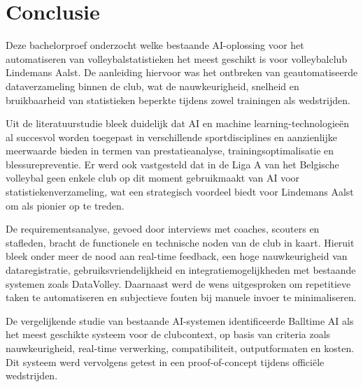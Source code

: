 
\chapter{Conclusie}%
\label{ch:conclusie}


Deze bachelorproef onderzocht welke bestaande AI-oplossing voor het automatiseren van volleybalstatistieken het meest geschikt is voor volleybalclub Lindemans Aalst. De aanleiding hiervoor was het ontbreken van geautomatiseerde dataverzameling binnen de club, wat de nauwkeurigheid, snelheid en bruikbaarheid van statistieken beperkte tijdens zowel trainingen als wedstrijden.

Uit de literatuurstudie bleek duidelijk dat AI en machine learning-technologieën al succesvol worden toegepast in verschillende sportdisciplines en aanzienlijke meerwaarde bieden in termen van prestatieanalyse, trainingsoptimalisatie en blessurepreventie. Er werd ook vastgesteld dat in de Liga A van het Belgische volleybal geen enkele club op dit moment gebruikmaakt van AI voor statistiekenverzameling, wat een strategisch voordeel biedt voor Lindemans Aalst om als pionier op te treden.

De requirementsanalyse, gevoed door interviews met coaches, scouters en stafleden, bracht de functionele en technische noden van de club in kaart. Hieruit bleek onder meer de nood aan real-time feedback, een hoge nauwkeurigheid van dataregistratie, gebruiksvriendelijkheid en integratiemogelijkheden met bestaande systemen zoals DataVolley. Daarnaast werd de wens uitgesproken om repetitieve taken te automatiseren en subjectieve fouten bij manuele invoer te minimaliseren.

De vergelijkende studie van bestaande AI-systemen identificeerde Balltime AI als het meest geschikte systeem voor de clubcontext, op basis van criteria zoals nauwkeurigheid, real-time verwerking, compatibiliteit, outputformaten en kosten. Dit systeem werd vervolgens getest in een proof-of-concept tijdens officiële wedstrijden.

